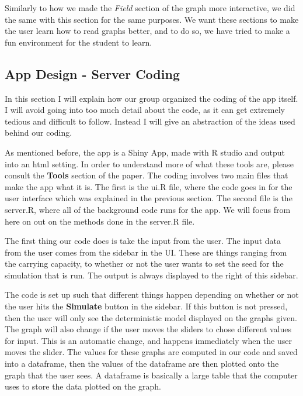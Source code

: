 \documentclass{article}\usepackage[]{graphicx}\usepackage[]{color}
\begin{document}
Similarly to how we made the \textit{Field} section of the graph more interactive, we did the same with this section for the same purposes. We want these sections to make the user learn how to read graphs better, and to do so, we have tried to make a fun environment for the student to learn.






\subsection{App Design - Server Coding}

In this section I will explain how our group organized the coding of the app itself. I will avoid going into too much detail about the code, as it can get extremely tedious and difficult to follow. Instead I will give an abstraction of the ideas used behind our coding.

As mentioned before, the app is a Shiny App, made with R studio and output into an html setting. In order to understand more of what these tools are, please consult the \textbf{Tools} section of the paper. The coding involves two main files that make the app what it is. The first is the ui.R file, where the code goes in for the user interface which was explained in the previous section. The second file is the server.R, where all of the background code runs for the app. We will focus from here on out on the methods done in the server.R file. 

The first thing our code does is take the input from the user. The input data from the user comes from the sidebar in the UI. These are things ranging from the carrying capacity, to whether or not the user wants to set the seed for the simulation that is run. The output is always displayed to the right of this sidebar. 

The code is set up such that different things happen depending on whether or not the user hits the \textbf{Simulate} button in the sidebar. If this button is not pressed, then the user will only see the deterministic model displayed on the graphs given. The graph will also change if the user moves the sliders to chose different values for input. This is an automatic change, and happens immediately when the user moves the slider. The values for these graphs are computed in our code and saved into a dataframe, then the values of the dataframe are then plotted onto the graph that the user sees. A dataframe is basically a large table that the computer uses to store the data plotted on the graph. 
\end{document}
